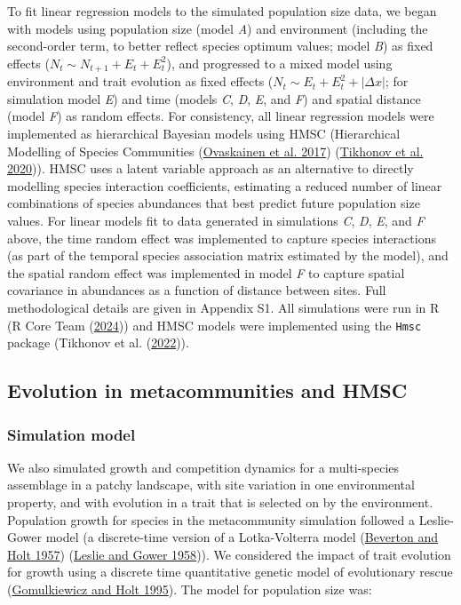 \documentclass[
]{article}
\begin{document}
To fit linear regression models to the simulated population size data, we began with models using population size (model \emph{A}) and environment (including the second-order term, to better reflect species optimum values; model \emph{B}) as fixed effects (\(N_t \sim N_{t+1} + E_t + E_t^2\)), and progressed to a mixed model using environment and trait evolution as fixed effects (\(N_t \sim E_t + E_t^2 + |\Delta x|\); for simulation model \emph{E}) and time (models \emph{C}, \emph{D}, \emph{E}, and \emph{F}) and spatial distance (model \emph{F}) as random effects. For consistency, all linear regression models were implemented as hierarchical Bayesian models using HMSC (Hierarchical Modelling of Species Communities (\protect\hyperlink{ref-Ovaskainen2017HMSC}{Ovaskainen et al. 2017}) (\protect\hyperlink{ref-Tikhonov2020}{Tikhonov et al. 2020})). HMSC uses a latent variable approach as an alternative to directly modelling species interaction coefficients, estimating a reduced number of linear combinations of species abundances that best predict future population size values. For linear models fit to data generated in simulations \emph{C}, \emph{D}, \emph{E}, and \emph{F} above, the time random effect was implemented to capture species interactions (as part of the temporal species association matrix estimated by the model), and the spatial random effect was implemented in model \emph{F} to capture spatial covariance in abundances as a function of distance between sites. Full methodological details are given in Appendix S1. All simulations were run in R (R Core Team (\protect\hyperlink{ref-R2024}{2024})) and HMSC models were implemented using the \texttt{Hmsc} package (Tikhonov et al. (\protect\hyperlink{ref-Hmsc2022}{2022})).

\hypertarget{evolution-in-metacommunities-and-hmsc}{%
\subsection{Evolution in metacommunities and HMSC}\label{evolution-in-metacommunities-and-hmsc}}

\hypertarget{simulation-model}{%
\subsubsection{Simulation model}\label{simulation-model}}

We also simulated growth and competition dynamics for a multi-species assemblage in a patchy landscape, with site variation in one environmental property, and with evolution in a trait that is selected on by the environment. Population growth for species in the metacommunity simulation followed a Leslie-Gower model (a discrete-time version of a Lotka-Volterra model (\protect\hyperlink{ref-Beverton1957}{Beverton and Holt 1957}) (\protect\hyperlink{ref-Leslie1958}{Leslie and Gower 1958})). We considered the impact of trait evolution for growth using a discrete time quantitative genetic model of evolutionary rescue (\protect\hyperlink{ref-Gomulkiewicz1995}{Gomulkiewicz and Holt 1995}). The model for population size was:
\end{document}

